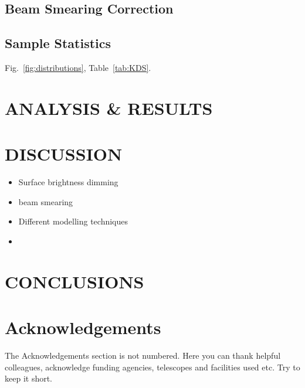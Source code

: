 \documentclass[a4paper,fleqn,usenatbib]{mn2e}
\begin{document}
\subsection{Beam Smearing Correction}





  




\subsection{Sample Statistics}



Fig.~\ref{fig:distributions}, Table~\ref{tab:KDS}.



\section{ANALYSIS \& RESULTS}\label{sec:results}



\section{DISCUSSION}\label{sec:discussion}

\begin{itemize}
    \item Surface brightness dimming
    \item beam smearing
    \item Different modelling techniques
    \item 
\end{itemize}

\section{CONCLUSIONS}\label{sec:conclusions}



\section*{Acknowledgements}

The Acknowledgements section is not numbered. Here you can thank helpful
colleagues, acknowledge funding agencies, telescopes and facilities used etc.
Try to keep it short.

\end{document}
